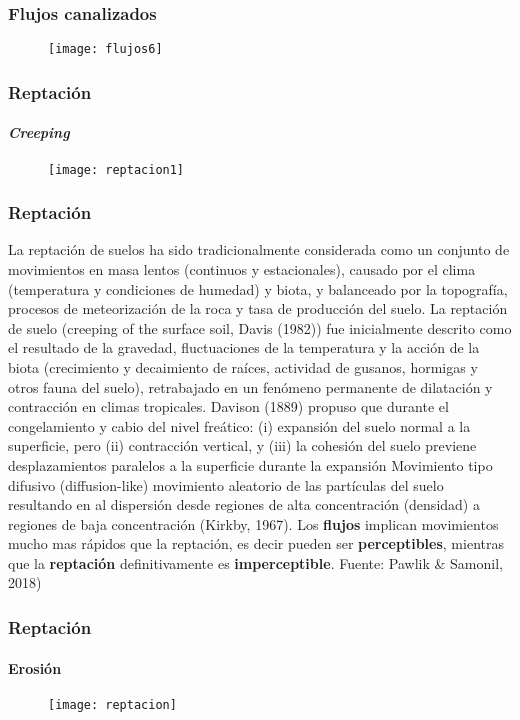 \documentclass[12pt]{beamer}
\begin{document}
\begin{frame}
\frametitle{Flujos canalizados}
\begin{figure}
\centering
\texttt{[image: flujos6]} 
\end{figure}
\end{frame}
\begin{frame}
\frametitle{Reptación}
\framesubtitle{\emph{Creeping}}
\begin{figure}
\centering
\texttt{[image: reptacion1]} 
\end{figure}
\end{frame}
\begin{frame}
\frametitle{Reptación}
\scriptsize{
La reptación de suelos ha sido tradicionalmente considerada como un conjunto de movimientos en masa lentos (continuos y estacionales), causado por el clima (temperatura y condiciones de humedad) y biota, y balanceado por la topografía, procesos de meteorización de la roca y tasa de producción del suelo.
\vfill
La reptación de suelo (creeping of the surface soil, Davis (1982)) fue inicialmente descrito como el resultado de la gravedad, fluctuaciones de la temperatura y la acción de la biota (crecimiento y decaimiento de raíces, actividad de gusanos, hormigas y otros fauna del suelo), retrabajado en un fenómeno permanente de dilatación y contracción en climas tropicales. 
\vfill
Davison (1889) propuso que durante el congelamiento y cabio del nivel freático: (i) expansión del suelo normal a la superficie, pero (ii) contracción vertical, y (iii) la cohesión del suelo previene desplazamientos paralelos a la superficie durante la expansión
\vfill
Movimiento tipo difusivo (diffusion-like) movimiento aleatorio de las partículas del suelo resultando en al dispersión desde regiones de alta concentración (densidad) a regiones de baja concentración (Kirkby, 1967).
\vfill
\centering
Los \textbf{flujos} implican movimientos mucho mas rápidos que la reptación, es decir pueden ser \textbf{perceptibles}, mientras que la \textbf{reptación} definitivamente es \textbf{imperceptible}.
}
\tiny{Fuente: Pawlik \& Samonil, 2018)}
\end{frame}
\begin{frame}
\frametitle{Reptación}
\framesubtitle{Erosión}
\begin{figure}
\centering
\texttt{[image: reptacion]} 
\end{figure}
\end{frame}
\end{document}
